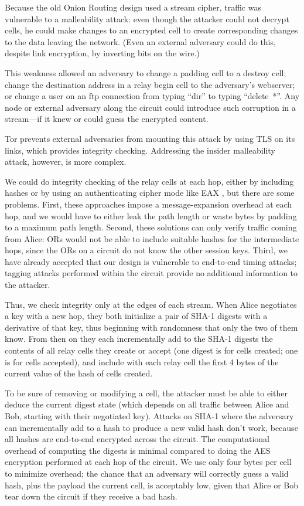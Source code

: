 \documentclass[times,10pt,twocolumn]{article}
\begin{document}

Because the old Onion Routing design used a stream cipher, traffic was
vulnerable to a malleability attack: even though the attacker could not
decrypt cells, he could make changes to an encrypted
cell to create corresponding changes to the data leaving the network.
(Even an external adversary could do this, despite link encryption, by
inverting bits on the wire.)

This weakness allowed an adversary to change a padding cell to a destroy
cell; change the destination address in a relay begin cell to the
adversary's webserver; or change a user on an ftp connection from
typing ``dir'' to typing ``delete~*''. Any node or external adversary
along the circuit could introduce such corruption in a stream---if it
knew or could guess the encrypted content.

Tor prevents external adversaries from mounting this attack by
using TLS on its links, which provides integrity checking.
Addressing the insider malleability attack, however, is
more complex.

We could do integrity checking of the relay cells at each hop, either
by including hashes or by using an authenticating cipher mode like
EAX \cite{eax}, but there are some problems. First, these approaches
impose a message-expansion overhead at each hop, and we would have to
either leak the path length or waste bytes by padding to a maximum
path length. Second, these solutions can only verify traffic coming
from Alice: ORs would not be able to include suitable hashes for
the intermediate hops, since the ORs on a circuit do not know the
other session keys. Third, we have already accepted that our design
is vulnerable to end-to-end timing attacks; tagging attacks performed
within the circuit provide no additional information to the attacker.

Thus, we check integrity only at the edges of each stream. When Alice
negotiates a key with a new hop, they both initialize a pair of SHA-1 
digests with a derivative of that key,
thus beginning with randomness that only the two of them know. From
then on they each incrementally add to the SHA-1 digests the contents of 
all relay cells they create or accept (one digest is for cells
created; one is for cells accepted), and include with each relay cell
the first 4 bytes of the current value of the hash of cells created.

To be sure of removing or modifying a cell, the attacker must be able
to either deduce the current digest state (which depends on all
traffic between Alice and Bob, starting with their negotiated key).
Attacks on SHA-1 where the adversary can incrementally add to a hash
to produce a new valid hash don't work, because all hashes are
end-to-end encrypted across the circuit.  The computational overhead
of computing the digests is minimal compared to doing the AES
encryption performed at each hop of the circuit. We use only four
bytes per cell to minimize overhead; the chance that an adversary will
correctly guess a valid hash, plus the payload the current cell, is
acceptably low, given that Alice or Bob tear down the circuit if they
receive a bad hash.
\end{document}
